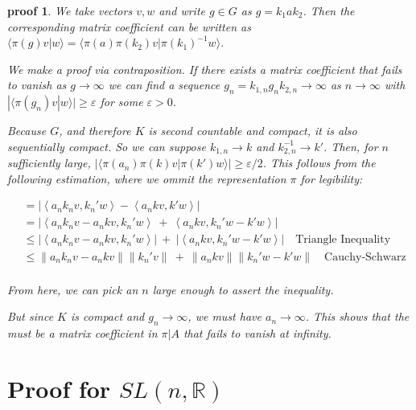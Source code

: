 \documentclass[
  12pt
]{article}
\theoremstyle{break}
\theoremstyle{plain}
\newtheorem*{pf}{proof}
\newcommand{\abs}[1]{| #1 |}
\newcommand{\inn}[1]{\left\langle #1 \right\rangle}
\newcommand{\norm}[1]{\lVert #1 \rVert}
\begin{document}
  \begin{pf}
    \label{pf:lemma}
    We take vectors $v, w$ and write $g \in G$ as $g = k_1 a k_2$.
    Then the corresponding matrix
    coefficient can be written as $\langle \pi(g)v|w \rangle = \langle \pi(a) \pi(k_2) v | \pi(k_1)^{-1} w \rangle$.

    We make a proof via contraposition.
    If there exists a matrix coefficient that fails to vanish as $g \rightarrow \infty$
    we can find a sequence $g_n = k_{1,n} g_{n} k_{2,n} \rightarrow \infty$ as
    $n \rightarrow \infty$ with
    $|\langle \pi(g_n) v | w \rangle | \geq \varepsilon$ for some $\varepsilon > 0$.

    Because $G$, and therefore $K$ is second countable and compact, it is also sequentially compact.
    So we can suppose $k_{1,n} \rightarrow k$ and $k_{2,n}^{-1} \rightarrow k'$.
    Then, for $n$ sufficiently large, $|\langle \pi(a_n)\pi(k)v | \pi(k') w \rangle | \geq \varepsilon/2$.
    This follows from the following estimation, where we ommit the representation $\pi$ for legibility:

    \begin{align*}
        &=\abs{\inn{a_n k_n v, k_n' w} - \inn{a_n k v, k' w}} \\
        &= \abs{\inn{a_nk_nv - a_nkv, k_n'w} \ + \ \inn{a_nkv, k_n'w - k'w}}  \\
        &\leq \abs{\inn{a_nk_nv - a_nkv, k_n'w}} \ + \ \abs{\inn{a_nkv, k_n'w - k'w}} \quad \text{Triangle Inequality} \\
        &\leq \norm{a_nk_nv - a_nkv}\norm{k_n'v} \ + \ \norm{a_nkv}\norm{k_n'w - k'w} \quad \text{Cauchy-Schwarz} \\
     \end{align*}

    From here, we can pick an $n$ large enough to assert the inequality.

    But since $K$ is compact and $g_n \rightarrow \infty$, we must have
    $a_n \rightarrow \infty$. This shows that the must be a matrix
    coefficient in $\pi | A$ that fails to vanish at infinity.
  \end{pf}




\hypertarget{proof-for-slnr}{%
  \section{Proof for \texorpdfstring{$SL(n, \mathbb{R})$}{SL(n, R)}}
\label{proof-for-slnr}}
\end{document}
